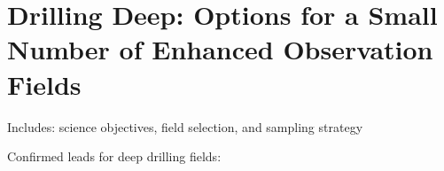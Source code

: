 \chapter[Deep Drilling Fields]{Drilling Deep: Options for a Small Number of Enhanced Observation
Fields}
\label{chp:deepdrilling}


Includes: science objectives, field selection, and sampling strategy

Confirmed leads for deep drilling fields:
